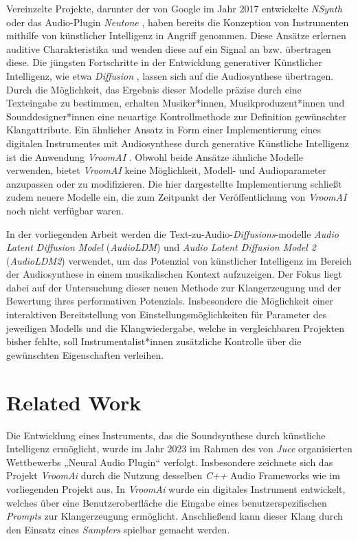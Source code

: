 \documentclass[
  a4paper,  %
  twoside,  %
  bibliography=totoc,
  headsepline,
  cleardoublepage=empty,
  parskip=half,
  draft=false
]{scrbook}
\begin{document}
Vereinzelte Projekte, darunter der von Google im Jahr 2017 entwickelte \emph{NSynth} \cite{google_ai_nsynth_2017} oder das Audio-Plugin \emph{Neutone} \cite{qosmo_neutone_nodate}, haben bereits die Konzeption von Instrumenten mithilfe von künstlicher Intelligenz in Angriff genommen. Diese Ansätze erlernen auditive Charakteristika und wenden diese auf ein Signal an bzw. übertragen diese. Die jüngsten Fortschritte in der Entwicklung generativer Künstlicher Intelligenz, wie etwa \emph{Diffusion} \cite{sohl-dickstein_deep_2015, ho_denoising_2020, nichol_improved_2021, dhariwal_diffusion_2021}, lassen sich auf die Audiosynthese übertragen. Durch die Möglichkeit, das Ergebnis dieser Modelle präzise durch eine Texteingabe zu bestimmen, erhalten Musiker*innen, Musikproduzent*innen und Sounddesigner*innen eine neuartige Kontrollmethode zur Definition gewünschter Klangattribute. Ein ähnlicher Ansatz in Form einer Implementierung eines digitalen Instrumentes mit Audiosynthese durch generative Künstliche Intelligenz ist die Anwendung \emph{VroomAI} \cite{barney_hill_vroomai_2023}.  Obwohl beide Ansätze ähnliche Modelle verwenden, bietet \emph{VroomAI} keine Möglichkeit, Modell- und Audioparameter anzupassen oder zu modifizieren. Die hier dargestellte Implementierung schließt zudem neuere Modelle ein, die zum Zeitpunkt der Veröffentlichung von \emph{VroomAI} noch nicht verfügbar waren.

In der vorliegenden Arbeit werden die Text-zu-Audio-\emph{Diffusions}-modelle \emph{Audio Latent Diffusion Model} (\emph{AudioLDM}) \cite{liu_audioldm_2023} und  \emph{Audio Latent Diffusion Model 2} (\emph{AudioLDM2}) \cite{liu_audioldm2_2023} verwendet, um das Potenzial von künstlicher Intelligenz im Bereich der Audiosynthese in einem musikalischen Kontext aufzuzeigen. Der Fokus liegt dabei auf der Untersuchung dieser neuen Methode zur Klangerzeugung und der Bewertung ihres performativen Potenzials. Insbesondere die Möglichkeit einer interaktiven Bereitstellung von Einstellungsmöglichkeiten für Parameter des jeweiligen Modells und die Klangwiedergabe, welche in vergleichbaren Projekten bisher fehlte, soll Instrumentalist*innen zusätzliche Kontrolle über die gewünschten Eigenschaften verleihen.

\chapter{Related Work}


Die Entwicklung eines Instruments, das die Soundsynthese durch künstliche Intelligenz ermöglicht, wurde im Jahr 2023 im Rahmen des von \emph{Juce} \cite{noauthor_juce_nodate} organisierten Wettbewerbs „Neural Audio Plugin“ verfolgt. Insbesondere zeichnete sich das Projekt \emph{VroomAi} \cite{barney_hill_vroomai_2023} durch die Nutzung desselben \emph{C++} Audio Frameworks wie im vorliegenden Projekt aus. In \emph{VroomAi} wurde ein digitales Instrument entwickelt, welches über eine Benutzeroberfläche die Eingabe eines benutzerspezifischen \emph{Prompts} zur Klangerzeugung ermöglicht. Anschließend kann dieser Klang durch den Einsatz eines \emph{Samplers} spielbar gemacht werden.
\end{document}
